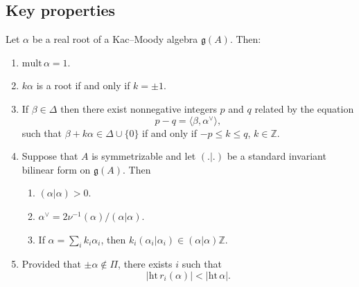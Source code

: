 \documentclass[12pt]{article}
\begin{document}
\subsection{Key properties}
\begin{proposition}\label{prop:real-roots}
    Let $\alpha$ be a real root of a Kac--Moody algebra $\mathfrak{g}(A)$. Then:
    \begin{enumerate}[label=\alph*)]
        \item $\mathrm{mult}\,\alpha = 1$.
        \item $k\alpha$ is a root if and only if $k = \pm 1$.
        \item If $\beta \in \Delta$ then there exist nonnegative integers $p$ and $q$ related by the equation
              \[
                  p - q = \langle \beta, \alpha^\vee \rangle,
              \]
              such that $\beta + k\alpha \in \Delta \cup \{0\}$ if and only if $-p \leq k \leq q$, $k \in \mathbb{Z}$.
        \item Suppose that $A$ is symmetrizable and let $(.|.)$ be a standard invariant bilinear form on $\mathfrak{g}(A)$. Then
              \begin{enumerate}[label=(\roman*)]
                  \item $(\alpha|\alpha) > 0$.
                  \item $\alpha^\vee = 2\nu^{-1}(\alpha)/(\alpha|\alpha)$.
                  \item If $\alpha = \sum_i k_i \alpha_i$, then $k_i(\alpha_i|\alpha_i) \in (\alpha|\alpha)\mathbb{Z}$.
              \end{enumerate}
        \item Provided that $\pm \alpha \notin \Pi$, there exists $i$ such that
              \[
                  |\mathrm{ht}\, r_i(\alpha)| < |\mathrm{ht}\,\alpha|.
              \]
    \end{enumerate}
\end{proposition}
\end{document}
